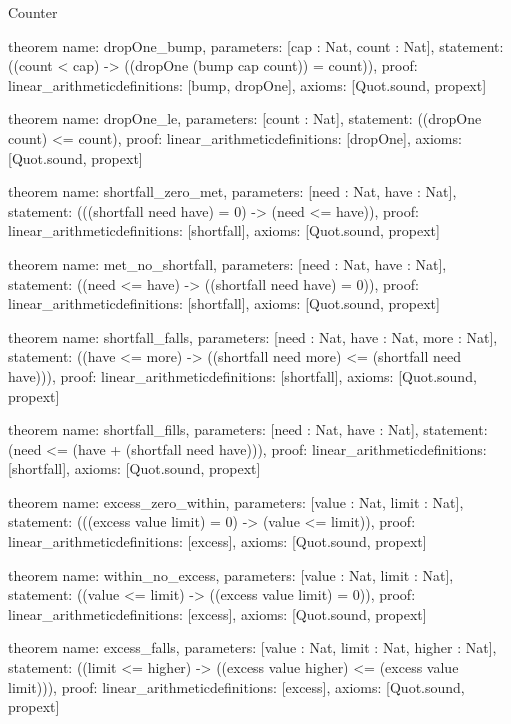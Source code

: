 \begin{lexlean}{Counter}
\begin{semanticmodule}
theorem{
  name: dropOne_bump,
  parameters: [cap : Nat, count : Nat],
  statement: ((count < cap) -> ((dropOne (bump cap count)) = count)),
  proof: linear_arithmetic{definitions: [bump, dropOne]},
  axioms: [Quot.sound, propext]
}

theorem{
  name: dropOne_le,
  parameters: [count : Nat],
  statement: ((dropOne count) <= count),
  proof: linear_arithmetic{definitions: [dropOne]},
  axioms: [Quot.sound, propext]
}

theorem{
  name: shortfall_zero_met,
  parameters: [need : Nat, have : Nat],
  statement: (((shortfall need have) = 0) -> (need <= have)),
  proof: linear_arithmetic{definitions: [shortfall]},
  axioms: [Quot.sound, propext]
}

theorem{
  name: met_no_shortfall,
  parameters: [need : Nat, have : Nat],
  statement: ((need <= have) -> ((shortfall need have) = 0)),
  proof: linear_arithmetic{definitions: [shortfall]},
  axioms: [Quot.sound, propext]
}

theorem{
  name: shortfall_falls,
  parameters: [need : Nat, have : Nat, more : Nat],
  statement: ((have <= more) -> ((shortfall need more) <= (shortfall need have))),
  proof: linear_arithmetic{definitions: [shortfall]},
  axioms: [Quot.sound, propext]
}

theorem{
  name: shortfall_fills,
  parameters: [need : Nat, have : Nat],
  statement: (need <= (have + (shortfall need have))),
  proof: linear_arithmetic{definitions: [shortfall]},
  axioms: [Quot.sound, propext]
}

theorem{
  name: excess_zero_within,
  parameters: [value : Nat, limit : Nat],
  statement: (((excess value limit) = 0) -> (value <= limit)),
  proof: linear_arithmetic{definitions: [excess]},
  axioms: [Quot.sound, propext]
}

theorem{
  name: within_no_excess,
  parameters: [value : Nat, limit : Nat],
  statement: ((value <= limit) -> ((excess value limit) = 0)),
  proof: linear_arithmetic{definitions: [excess]},
  axioms: [Quot.sound, propext]
}

theorem{
  name: excess_falls,
  parameters: [value : Nat, limit : Nat, higher : Nat],
  statement: ((limit <= higher) -> ((excess value higher) <= (excess value limit))),
  proof: linear_arithmetic{definitions: [excess]},
  axioms: [Quot.sound, propext]
}
\end{semanticmodule}
\end{lexlean}

